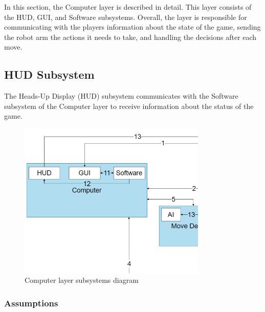 In this section, the Computer layer is described in detail. This layer consists of the HUD, GUI, and Software subsystems. Overall, the layer is responsible for communicating with the players information about the state of the game, sending the robot arm the actions it needs to take, and handling the decisions after each move.


\subsection{HUD Subsystem}

The Heads-Up Display (HUD) subsystem communicates with the Software subsystem of the Computer layer to receive information about the status of the game.

\begin{figure}[h!]
	\centering
 	\includegraphics[width=0.80\textwidth]{images/computer_subsystems.png}
 \caption{Computer layer subsystems diagram}
\end{figure}

\subsubsection{Assumptions}

